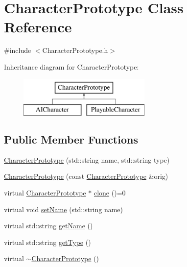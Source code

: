 \hypertarget{classCharacterPrototype}{}\section{Character\+Prototype Class Reference}
\label{classCharacterPrototype}


{\ttfamily \#include $<$Character\+Prototype.\+h$>$}

Inheritance diagram for Character\+Prototype\+:\begin{figure}[H]
\begin{center}
\leavevmode
\includegraphics[height=2.000000cm]{classCharacterPrototype}
\end{center}
\end{figure}
\subsection*{Public Member Functions}
\begin{DoxyCompactItemize}
\item 
\hyperlink{classCharacterPrototype_a6485d2e9c20779dc8f56943e63929e62}{Character\+Prototype} (std\+::string name, std\+::string type)
\item 
\hyperlink{classCharacterPrototype_abe3e17663cb992859d4fc3f3271e70e3}{Character\+Prototype} (const \hyperlink{classCharacterPrototype}{Character\+Prototype} \&orig)
\item 
virtual \hyperlink{classCharacterPrototype}{Character\+Prototype} $\ast$ \hyperlink{classCharacterPrototype_a7c3db310af19ff8c80eb3a7f20bd9986}{clone} ()=0
\item 
virtual void \hyperlink{classCharacterPrototype_aa656ad04dd911f24f2885dec50027bd8}{set\+Name} (std\+::string name)
\item 
virtual std\+::string \hyperlink{classCharacterPrototype_a97dd213c4515c631eac8957fec5d83fe}{get\+Name} ()
\item 
virtual std\+::string \hyperlink{classCharacterPrototype_abec1a7dacbee3aac9e67c75861b77ff1}{get\+Type} ()
\item 
virtual \hyperlink{classCharacterPrototype_a07cc2f45577611f264a954b1ff45777a}{$\sim$\+Character\+Prototype} ()
\end{DoxyCompactItemize}
